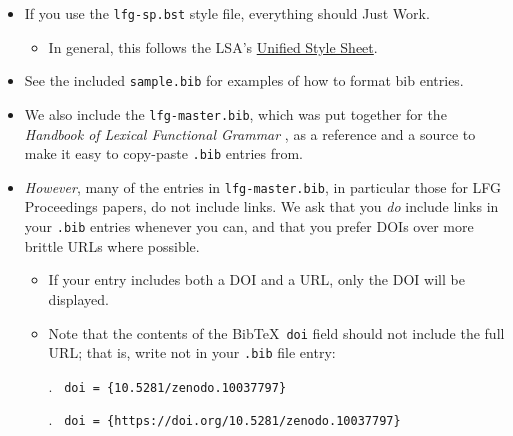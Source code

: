 \documentclass[linguex]{lfg-proc}
\newcommand{\goodex}{\makebox[0pt][r]{\normalfont\ding{51}\ignorespaces}}
\newcommand{\badex}{\makebox[0pt][r]{\normalfont\ding{55}\ignorespaces}}
\begin{document}
\begin{itemize}
  \item If you use the \verb=lfg-sp.bst= style file, everything should Just
        Work.
        \begin{itemize}
          \item In general, this follows the LSA's
                \href{https://www.linguisticsociety.org/resource/unified-style-sheet}{Unified
                Style Sheet}.
            \end{itemize}

  \item See the included \verb=sample.bib= for examples of how to format bib
        entries.

  \item We also include the \verb=lfg-master.bib=, which was put together for
        the \textit{Handbook of Lexical Functional Grammar}
        \citep{lfg-handbook}, as a reference and a source to make it easy to
        copy-paste \verb=.bib= entries from.

  \item \emph{However}, many of the entries in \verb=lfg-master.bib=, in
        particular those for LFG Proceedings papers, do not include links. We
        ask that you \emph{do} include links in your \verb=.bib= entries
        whenever you can, and that you prefer DOIs over more brittle URLs where
        possible.
        \begin{itemize}
          \item If your entry includes both a DOI and a URL, only the DOI will
                be displayed.
          \item Note that the contents of the Bib\TeX\ \verb=doi= field should not
                include the full URL; that is, write \Next not \NNext in your
                \verb=.bib= file entry:

                \ex. \goodex\ \texttt{doi = \{10.5281/zenodo.10037797\}}

                \ex. \badex\ \texttt{doi = \{https://doi.org/10.5281/zenodo.10037797\}}

        \end{itemize}


\end{itemize}
\end{document}
